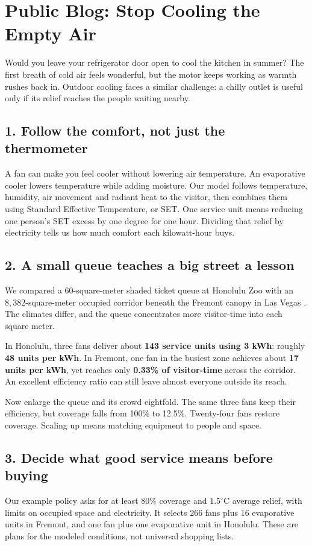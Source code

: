 \clearpage
\section*{Public Blog: Stop Cooling the Empty Air}

Would you leave your refrigerator door open to cool the kitchen in summer? The first breath of cold air feels wonderful, but the motor keeps working as warmth rushes back in. Outdoor cooling faces a similar challenge: a chilly outlet is useful only if its relief reaches the people waiting nearby.

\subsection*{1. Follow the comfort, not just the thermometer}
A fan can make you feel cooler without lowering air temperature. An evaporative cooler lowers temperature while adding moisture. Our model follows temperature, humidity, air movement and radiant heat to the visitor, then combines them using Standard Effective Temperature, or SET. One service unit means reducing one person's SET excess by one degree for one hour. Dividing that relief by electricity tells us how much comfort each kilowatt-hour buys.

\subsection*{2. A small queue teaches a big street a lesson}
We compared a $60$-square-meter shaded ticket queue at Honolulu Zoo with an $8{,}382$-square-meter occupied corridor beneath the Fremont canopy in Las Vegas \cite{honolulu-zoo-entrance,fremont-canopy}. The climates differ, and the queue concentrates more visitor-time into each square meter.

In Honolulu, three fans deliver about \textbf{143 service units using 3 kWh}: roughly \textbf{48 units per kWh}. In Fremont, one fan in the busiest zone achieves about \textbf{17 units per kWh}, yet reaches only \textbf{0.33\% of visitor-time} across the corridor. An excellent efficiency ratio can still leave almost everyone outside its reach.

Now enlarge the queue and its crowd eightfold. The same three fans keep their efficiency, but coverage falls from 100\% to 12.5\%. Twenty-four fans restore coverage. Scaling up means matching equipment to people and space.

\subsection*{3. Decide what good service means before buying}
Our example policy asks for at least 80\% coverage and $1.5^\circ$C average relief, with limits on occupied space and electricity. It selects 266 fans plus 16 evaporative units in Fremont, and one fan plus one evaporative unit in Honolulu. These are plans for the modeled conditions, not universal shopping lists.

